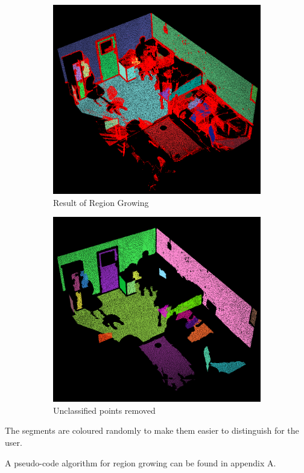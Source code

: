 		
		\begin{figure}[H]
			\centering
			\begin{subfigure}{.5\textwidth}
				\centering
				\includegraphics[width=0.7\linewidth]{Includes/images/GrownRegions}
				\caption{Result of Region Growing}
				\label{fig:GrownRegions}
			\end{subfigure}%
			\begin{subfigure}{.5\textwidth}
				\centering
				\includegraphics[width=0.7\linewidth]{Includes/images/RG-noUnclass}
				\caption{Unclassified points removed}
				\label{fig:RG-noUnclass}
			\end{subfigure}
			\caption{}
		\end{figure} 
		
		The segments are coloured randomly to make them easier to distinguish for the user.
		
		A pseudo-code algorithm for region growing can be found in appendix A.
		
